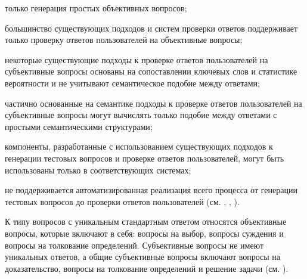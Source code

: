 \begin{textitemize}
	\item только генерация простых объективных вопросов;
	\item большинство существующих подходов и систем проверки ответов поддерживает только проверку ответов пользователей на объективные вопросы;
	\item некоторые существующие подходы к проверке ответов пользователей на субъективные вопросы основаны на сопоставлении ключевых слов и статистике вероятности и не учитывают семантическое подобие между ответами;
	\item частично основанные на семантике подходы к проверке ответов пользователей на субъективные вопросы могут вычислять только подобие между ответами с простыми семантическими структурами;
	\item компоненты, разработанные с использованием существующих подходов к генерации тестовых вопросов и проверке ответов пользователей, могут быть использованы только в соответствующих системах;
	\item не поддерживается автоматизированная реализация всего процесса от генерации тестовых вопросов до проверки ответов пользователей (см. , , ).
\end{textitemize}

К типу вопросов с уникальным стандартным ответом относятся объективные вопросы, которые включают в себя: вопросы на выбор, вопросы суждения и вопросы на толкование определений. Субъективные вопросы не имеют уникальных ответов, а общие субъективные вопросы включают вопросы на доказательство, вопросы на толкование определений и решение задачи (см. ).


